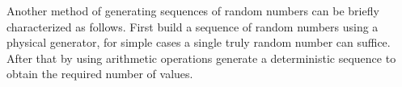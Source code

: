 Another method of generating sequences of random numbers can be briefly characterized as follows.
First build a sequence of random numbers using a physical generator, for simple cases a single truly
random number can suffice. 
After that by using arithmetic operations generate a deterministic sequence to obtain the required 
number of values.
